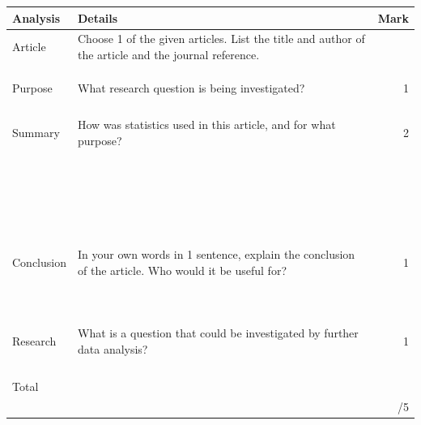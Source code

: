 \documentclass[bigtut]{quiz}\usepackage[]{graphicx}\usepackage[]{color}
\begin{document}
\begin{tutorial}
\begin{tabular}{|l|l|r|} \hline
{\bf Analysis} & {\bf Details} \hspace{11cm} & {\bf Mark} \\ \hline
Article & {\tiny Choose 1 of the given articles. List the title and author of the article and the journal reference.} &   \\
& & \\
& & \\ 
& & \\  \hline
Purpose & {\tiny What research question is being investigated?} & 1 \\
& & \\ 
& & \\ 
& & \\ 
& & \\ \hline
Summary & {\tiny How was statistics used in this article, and for what purpose?} & 2 \\
& & \\ 
& & \\ 
& & \\
& & \\ 
& & \\ 
& & \\ 
& & \\ 
& & \\ 
& & \\ 
& & \\ 
& & \\ 
& & \\ 
& & \\ 
& & \\ 
& & \\ 
& & \\ 
& & \\
& & \\ 
& & \\ 
& & \\
& & \\
& & \\\hline
Conclusion & {\tiny In your own words in 1 sentence, explain the conclusion of the article. Who would it be useful for?} & 1 \\
& & \\ 
& & \\
& & \\ 
& & \\ 
& & \\ 
& & \\ 
& & \\ 
& & \\
& & \\
& & \\ \hline
Research & {\tiny What is a question that could be investigated by further data analysis?} & 1 \\
&  &  \\ 
& & \\
& & \\ 
& & \\ \hline
Total & &  \\ 
& & /5 \\ \hline
\end{tabular}





\end{tutorial}
\end{document}
